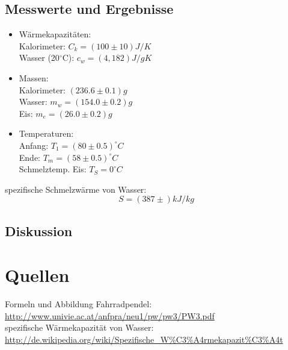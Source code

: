 \documentclass[12pt,a4paper]{article}
\begin{document}
\begin{multicols}{2}


\subsection{Messwerte und Ergebnisse}

\begin{itemize}
	\item Wärmekapazitäten:\\
	Kalorimeter: $C_k = (100 \pm 10) J/K$\\
	Wasser (20$^{\circ}$C): $c_w=(4,182) J/gK$
	
	\item Massen:\\
	Kalorimeter: $(236.6 \pm 0.1)g$\\
	Wasser: $m_w = (154.0 \pm 0.2)g$\\
	Eis: $m_e = (26.0 \pm 0.2)g$
	
	\item Temperaturen:\\
	Anfang: $T_1=(80 \pm 0.5) ^\circ C$\\
	Ende: $T_m=(58 \pm 0.5) ^\circ C$\\
	Schmelztemp. Eis: $T_S = 0 ^\circ C$
\end{itemize}

\noindent spezifische Schmelzwärme von Wasser:\\
$$S =(387 \pm   ) kJ/kg$$

\subsection{Diskussion}

\section{Quellen}
Formeln und Abbildung Fahrradpendel:\\
\url{http://www.univie.ac.at/anfpra/neu1/pw/pw3/PW3.pdf}\\

\noindent spezifische Wärmekapazität von Wasser:\\
\url{http://de.wikipedia.org/wiki/Spezifische_W%C3%A4rmekapazit%C3%A4t}

\end{multicols}
\end{document}
